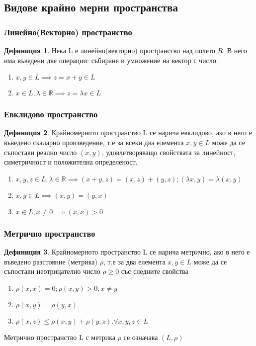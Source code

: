 \documentclass[a4paper,fleqn,12pt]{article}
\theoremstyle{definition}
\newtheorem{definition}{Дефиниция}[subsection]
\begin{document}
\subsection{Видове крайно мерни пространства}

\subsubsection{Линейно(Векторно) пространство}
	\begin{definition}
Нека L е линейно(векторно) пространство над полето $R$. В него има въведени две операции: събиране и умножение на вектор с число.
		\begin{enumerate}
 			\item $x,y \in L \implies z = x+ y \in L $
			\item $x \in L, \lambda \in \mathbb{R} \implies z = \lambda x \in L$
		\end{enumerate}
\end{definition}

\subsubsection{Евклидово пространство}
\begin{definition}
Крайномерното пространство L се нарича евклидово, ако в него е въведено скаларно произведение, т.е за всеки два елемента $x,y \in L$ може да се съпостави реално число $(x,y)$, удовлетворяващо свойствата за линейност, симетричност и положителна определеност.
	\begin{enumerate}
 		\item $x,y,z \in L ,\lambda \in \mathbb{R} \implies (x+y,z) = (x,z) + (y,z); (\lambda x,y) = \lambda(x,y)$
		\item $x,y \in L \implies (x,y) = (y,x)$
		\item $x \in L, x\neq 0 \implies (x,x) > 0 $
	\end{enumerate}
\end{definition}

\subsubsection{Метрично пространство}
\begin{definition}
Крайномерното пространство L се нарича метрично, ако в него е въведено разстояние (метрика) $\rho$, т.е за два елемента $x,y \in L$ може да се съпостави неотрицателно число  $\rho \geq 0 $  със следните свойства
	\begin{enumerate}
 		\item $\rho(x,x) = 0 ; \rho(x,y) > 0 , x\neq y $
		\item $\rho(x,y) = \rho(y,x)$
		\item $\rho(x,z) \leq \rho(x,y) + \rho(y,z). \forall x,y,z \in L$
	\end{enumerate}
Метрично пространство L с метрика $\rho$ се означава $(L,\rho)$
\end{definition}
\end{document}
